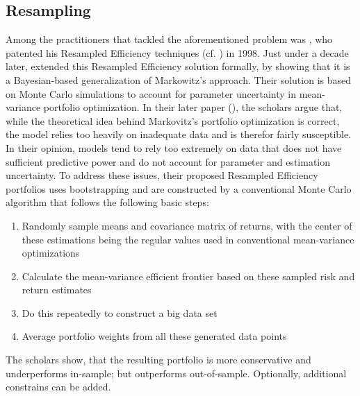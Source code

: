 \subsection{Resampling}
Among the practitioners that tackled the aforementioned problem was \citeauthor{michaud_1998}, who patented his Resampled Efficiency techniques (cf. \cite{michaud_1998}) in 1998. Just under a decade later, \cite{michaud_2007} extended this Resampled Efficiency solution formally, by showing that it is a Bayesian-based generalization of Markowitz’s approach. Their solution is based on Monte Carlo simulations to account for parameter uncertainty in mean-variance portfolio optimization.
In their later paper (\cite{michaud_2007}), the scholars argue that, while the theoretical idea behind Markovitz's portfolio optimization is correct, the model relies too heavily on inadequate data and is therefor fairly susceptible.
In their opinion, models tend to rely too extremely on data that does not have sufficient predictive power and do not account for parameter and estimation uncertainty.
To address these issues, their proposed Resampled Efficiency portfolios uses bootstrapping and are constructed by a conventional Monte Carlo algorithm that follows the following basic steps:
\begin{enumerate}
  \item Randomly sample means and covariance matrix of returns, with the center of these estimations being the regular values used in conventional mean-variance optimizations
  \item Calculate the mean-variance efficient frontier based on these sampled risk and return estimates
  \item Do this repeatedly to construct a big data set
  \item Average portfolio weights from all these generated data points
\end{enumerate}
The scholars show, that the resulting portfolio is more conservative and underperforms in-sample; but outperforms out-of-sample. Optionally, additional constrains can be added.\\
 